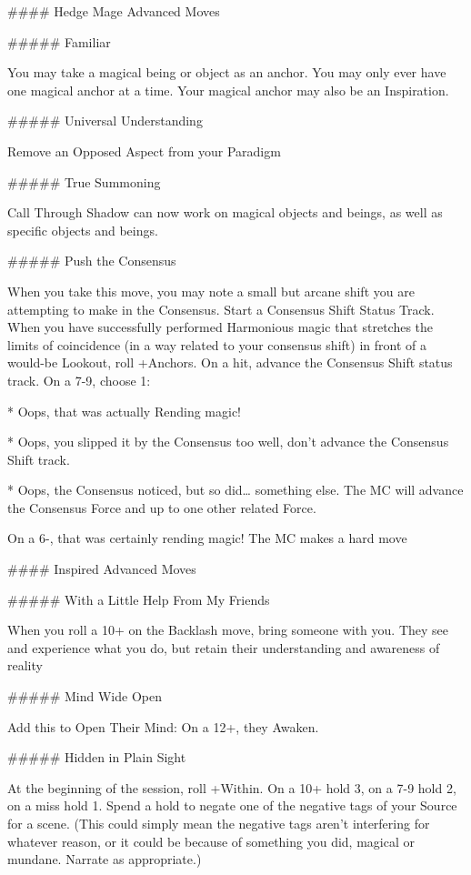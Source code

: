 \documentclass[
  oneside,
  statementpaper,
  9pt]{memoir}
\begin{document}
\begin{Player}
#### Hedge Mage Advanced Moves

##### Familiar

You may take a magical being or object as an anchor. You may only ever have one magical anchor at a time. Your magical anchor may also be an Inspiration.

##### Universal Understanding

Remove an Opposed Aspect from your Paradigm

##### True Summoning

Call Through Shadow can now work on magical objects and beings, as well as specific objects and beings.

##### Push the Consensus

When you take this move, you may note a small but arcane shift you are attempting to make in the Consensus. Start a Consensus Shift Status Track. When you have successfully performed Harmonious magic that stretches the limits of coincidence (in a way related to your consensus shift) in front of a would-be Lookout, roll +Anchors. On a hit, advance the Consensus Shift status track. On a 7-9, choose 1:

* Oops, that was actually Rending magic!

* Oops, you slipped it by the Consensus too well, don’t advance the Consensus Shift track.

* Oops, the Consensus noticed, but so did… something else. The MC will advance the Consensus Force and up to one other related Force.

On a 6-, that was certainly rending magic! The MC makes a hard move

#### Inspired Advanced Moves

##### With a Little Help From My Friends

When you roll a 10+ on the Backlash move, bring someone with you. They see and experience what you do, but retain their understanding and awareness of reality

##### Mind Wide Open

Add this to Open Their Mind: On a 12+, they Awaken.

##### Hidden in Plain Sight

At the beginning of the session, roll +Within. On a 10+ hold 3, on a 7-9 hold 2, on a miss hold 1. Spend a hold to negate one of the negative tags of your Source for a scene. (This could simply mean the negative tags aren't interfering for whatever reason, or it could be because of something you did, magical or mundane. Narrate as appropriate.)


\end{Player}
\end{document}

